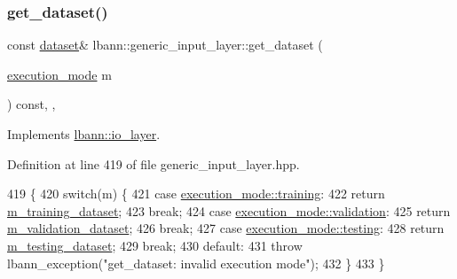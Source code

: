 \subsubsection{\texorpdfstring{get\+\_\+dataset()}{get\_dataset()}\hspace{0.1cm}{\footnotesize\ttfamily [2/2]}}
{\footnotesize\ttfamily const \hyperlink{classlbann_1_1dataset}{dataset}\& lbann\+::generic\+\_\+input\+\_\+layer\+::get\+\_\+dataset (\begin{DoxyParamCaption}\item[{\hyperlink{base_8hpp_a2781a159088df64ed7d47cc91c4dc0a8}{execution\+\_\+mode}}]{m }\end{DoxyParamCaption}) const\hspace{0.3cm}{\ttfamily [inline]}, {\ttfamily [override]}, {\ttfamily [virtual]}}



Implements \hyperlink{classlbann_1_1io__layer_ac46dfddf41dc6915db433fe269b53770}{lbann\+::io\+\_\+layer}.



Definition at line 419 of file generic\+\_\+input\+\_\+layer.\+hpp.


\begin{DoxyCode}
419                                                               \{
420     \textcolor{keywordflow}{switch}(m) \{
421     \textcolor{keywordflow}{case} \hyperlink{base_8hpp_a2781a159088df64ed7d47cc91c4dc0a8ac185ddac8b5a8f5aa23c5b80bc12d214}{execution\_mode::training}:
422       \textcolor{keywordflow}{return} \hyperlink{classlbann_1_1generic__input__layer_a23716635b1062bfe57f7fcf75140a63a}{m\_training\_dataset};
423       \textcolor{keywordflow}{break};
424     \textcolor{keywordflow}{case} \hyperlink{base_8hpp_a2781a159088df64ed7d47cc91c4dc0a8aa617908b172c473cb8e8cda059e55bf0}{execution\_mode::validation}:
425       \textcolor{keywordflow}{return} \hyperlink{classlbann_1_1generic__input__layer_abd70adf607d1cef87fb6641af77e816d}{m\_validation\_dataset};
426       \textcolor{keywordflow}{break};
427     \textcolor{keywordflow}{case} \hyperlink{base_8hpp_a2781a159088df64ed7d47cc91c4dc0a8aae2b1fca515949e5d54fb22b8ed95575}{execution\_mode::testing}:
428       \textcolor{keywordflow}{return} \hyperlink{classlbann_1_1generic__input__layer_a66b9ec6b393695232bd98edc62fc1348}{m\_testing\_dataset};
429       \textcolor{keywordflow}{break};
430     \textcolor{keywordflow}{default}:
431       \textcolor{keywordflow}{throw} lbann\_exception(\textcolor{stringliteral}{"get\_dataset: invalid execution mode"});
432     \}
433   \}
\end{DoxyCode}
\mbox{\label{classlbann_1_1generic__input__layer_a8ffe91a3d5b6f37d2dc17e657898dcc8}} 
